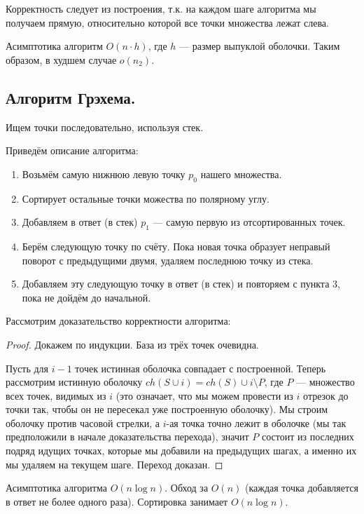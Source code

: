 \begin{remark}
  Корректность следует из построения, т.к. на каждом шаге алгоритма мы получаем прямую, относительно
  которой все точки множества лежат слева.
\end{remark}

\begin{remark}
  Асимптотика алгоритм $O(n \cdot h)$, где $h$ --- размер выпуклой оболочки. Таким образом, в худшем 
  случае $o(n_2)$.
\end{remark}

\subsection{Алгоритм Грэхема.}
Ищем точки последовательно, используя стек.

Приведём описание алгоритма:
\begin{enumerate}
  \item Возьмём самую нижнюю левую точку $p_0$ нашего множества.
  \item Сортирует остальные точки можества по полярному углу.
  \item Добавляем в ответ (в стек) $p_1$ --- самую первую из отсортированных точек.
  \item Берём следующую точку по счёту. Пока новая точка образует неправый поворот с предыдущими двумя,
    удаляем последнюю точку из стека.
  \item Добавляем эту следующую точку в ответ (в стек) и повторяем с пункта 3, пока не дойдём до начальной.
\end{enumerate}

Рассмотрим доказательство корректности алгоритма:
\begin{proof}
  Докажем по индукции. База из трёх точек очевидна.

  Пусть для $i - 1$ точек истинная оболочка совпадает с построенной. Теперь рассмотрим истинную
  оболочку $ch(S \cup i) = ch(S) \cup i \setminus P$, где $P$ --- множество всех точек, видимых из
  $i$ (это означает, что мы можем провести из $i$ отрезок до точки так, чтобы он не пересекал уже
  построенную оболочку). Мы строим оболочку против часовой стрелки, а $i$-ая точка точно лежит в 
  оболочке (мы так предположили в начале доказательства перехода), значит $P$ состоит из последних
  подряд идущих точках, которые мы добавили на предыдущих шагах, а именно их мы удаляем на текущем шаге.
  Переход доказан.
\end{proof}

\begin{remark}
  Асимптотика алгоритма $O(n\log n)$. Обход за $O(n)$ (каждая точка добавляется в ответ не более одного
  раза). Сортировка занимает $O(n \log n)$.
\end{remark}

